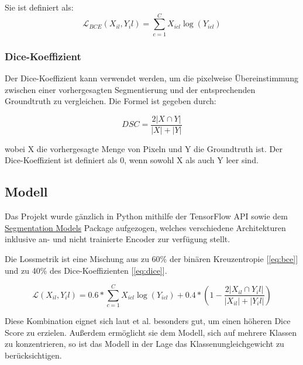 Sie ist definiert als:
\begin{equation}
\mathcal{L}_{BCE}\left(X_{i l}, Y_{i} l\right)=\sum_{c=1}^{C} X_{i c l} \log \left(Y_{i c l}\right)
\label{eq:bce}
\end{equation}

\subsubsection{Dice-Koeffizient} \label{ssec:dc}

Der Dice-Koeffizient kann verwendet werden, um die pixelweise Übereinstimmung zwischen einer vorhergesagten Segmentierung und der entsprechenden Groundtruth zu vergleichen. Die Formel ist gegeben durch:

\begin{equation}
D S C=\frac{2|X \cap Y|}{|X|+|Y|}
\label{eq:dice}
\end{equation}

wobei X die vorhergesagte Menge von Pixeln und Y die Groundtruth ist. Der Dice-Koeffizient ist definiert als 0, wenn sowohl X als auch Y leer sind.

\subsection{Modell}

Das Projekt wurde gänzlich in Python mithilfe der TensorFlow API sowie dem
 \href{https://deepai.org/machine-learning-glossary-and-terms/relu}{Segmentation Models} \citet{Yakubovskiy:2019}
 Package aufgezogen, welches verschiedene Architekturen inklusive an- und nicht trainierte Encoder zur verfügung stellt. 
 
 Die Lossmetrik ist eine Mischung aus zu 60\% der 
binären Kreuzentropie [\ref{eq:bce}] und zu 40\% des Dice-Koeffizienten [\ref{eq:dice}]. 


\begin{equation}
\mathcal{L}\left(X_{i l},{Y_{i}} l\right)= 0.6 * \sum_{c=1}^{C} X_{i c l} \log \left({Y}_{i c l}\right)+0.4 *\left(1-\frac{2\left|X_{i l} \cap {Y_{i}} l\right|}{\left|X_{i l}\right|+\left|{Y_{i}} l\right|}\right)
\label{eq:loss}
\end{equation}

Diese Kombination eignet sich laut \citet{Jadon_2020} et al. besonders gut, um einen höheren Dice Score zu erzielen. Außerdem ermöglicht sie dem Modell, sich auf mehrere Klassen zu konzentrieren, so ist das Modell in der Lage das Klassenungleichgewicht zu berücksichtigen. 

